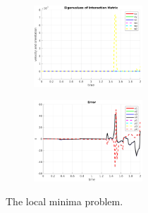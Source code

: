\documentclass[a4paper,12pt]{article}
\begin{document}
\begin{figure}[tb!]
\begin{subfigure}[b]{0.32\textwidth}
                 \end{subfigure}
         \begin{subfigure}[b]{0.2\textwidth}
                \centering
                \includegraphics[height=1.2in]{../results/Demo5-eignen.png}
                 \end{subfigure}%
         \begin{subfigure}[b]{0.32\textwidth}
                \centering
                \includegraphics[height=1.2in]{../results/Demo5-error.png}
                 \end{subfigure}%
         \caption{The local minima problem.} 
        \label{fig:demo5} 
\end{figure}
\end{document}
